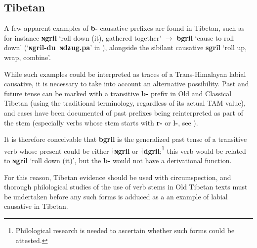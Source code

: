 \documentclass[oneside,a4paper,11pt]{article}
\newcommand{\ipa}[1]{\textbf{{\phon\mbox{#1}}}} %
\newcommand{\forme}[2]{\ipa{#1} `#2'}
\begin{document}
\subsection{Tibetan}
A few apparent examples of \ipa{b-} causative prefixes are found in Tibetan, such as for instance \forme{ɴgril}{roll down (it), gathered together} $\rightarrow$ \forme{bgril}{cause to roll down} (`\ipa{ɴgril-du ɴdʑug.pa}' in \citealt{bodrgya}), alongside the sibilant causative \forme{sgril}{roll up, wrap, combine}.

While such examples could be interpreted as traces of a Trans-Himalayan labial causative, it is necessary to take into account an alternative possibility. Past and future tense can be marked with a transitive \ipa{b-} prefix in Old and Classical Tibetan (using the traditional terminology, regardless of its actual TAM value), and cases have been documented of past prefixes being reinterpreted as part of the stem (especially verbs whose stem starts with \ipa{r-} or \ipa{l-}, see  \citet{hill05vbri, jacques10ndr, hill15lan}).

It is therefore conceivable that  \ipa{bgril} is the generalized past tense of a transitive verb whose present could be either $\dagger$\ipa{ɴgril} or $\dagger$\ipa{dgril};\footnote{Philological research is needed to ascertain whether such forms could be attested.} this verb would be related to \forme{ɴgril}{roll down (it)}, but the \ipa{b-} would not have a derivational function. 
 
For this reason, Tibetan evidence should be used with circumspection, and thorough philological studies of the use of verb stems in Old Tibetan texts must be undertaken before any such forms is adduced as a an example of labial causative in Tibetan.


%
%
%
\end{document}
